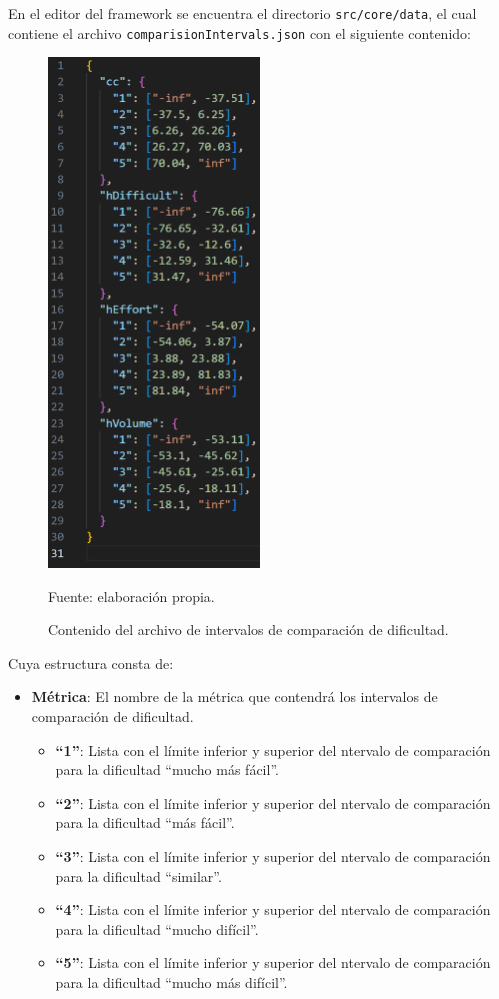 \documentclass[letterpaper,12pt]{article}
\begin{document}
En el editor del framework se encuentra el directorio \texttt{src/core/data}, el cual contiene el archivo \texttt{comparisionIntervals.json} con el siguiente contenido:
\begin{figure}[H]
  \centering
  \includegraphics[width=0.5\textwidth]{figures/metrics4.png}
  \caption{Contenido del archivo de intervalos de comparación de dificultad.} Fuente: elaboración propia.
  \label{img:metrics4}
\end{figure}
Cuya estructura consta de:
\begin{itemize}
  \item \textbf{Métrica}: El nombre de la métrica que contendrá los intervalos de comparación de dificultad.
        \begin{itemize}
          \item \textbf{``1''}: Lista con el límite inferior y superior del ntervalo de comparación para la dificultad ``mucho más fácil''.
          \item \textbf{``2''}: Lista con el límite inferior y superior del ntervalo de comparación para la dificultad ``más fácil''.
          \item \textbf{``3''}: Lista con el límite inferior y superior del ntervalo de comparación para la dificultad ``similar''.
          \item \textbf{``4''}: Lista con el límite inferior y superior del ntervalo de comparación para la dificultad ``mucho difícil''.
          \item \textbf{``5''}: Lista con el límite inferior y superior del ntervalo de comparación para la dificultad ``mucho más difícil''.
        \end{itemize}
\end{itemize}
\end{document}
